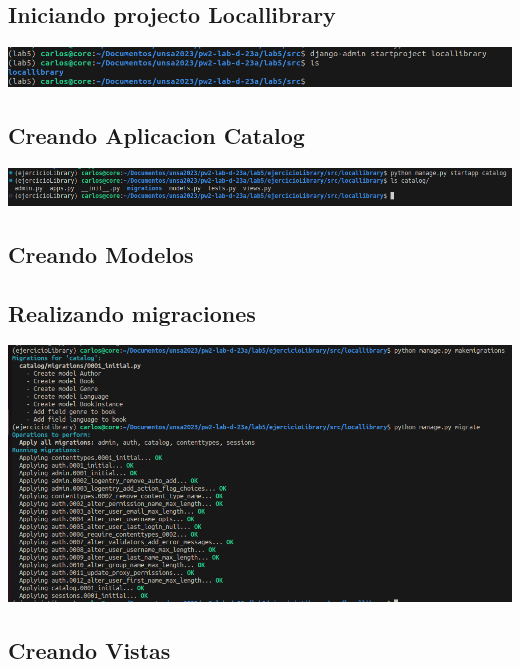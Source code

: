 \documentclass{article}
\begin{document}
\subsection{Iniciando projecto Locallibrary}
\begin{center}
    \includegraphics[scale=0.3]{img/iniciando-projecto-locallibrary.png}
\end{center}

\subsection{Creando Aplicacion Catalog}
\begin{center}
    \includegraphics[scale=0.3]{img/iniciando aplicacion catalog.png}
\end{center}

\subsection{Creando Modelos}


\subsection{Realizando migraciones}
\begin{center}
    \includegraphics[scale=0.3]{img/Realizando makemigrations y migrate.png}
\end{center}

\subsection{Creando Vistas}

\end{document}
